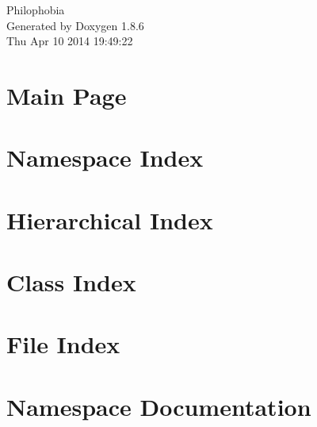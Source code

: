 \documentclass[twoside]{book}
\newcommand{\clearemptydoublepage}{%
  \newpage{\pagestyle{empty}\cleardoublepage}%
}
\begin{document}
\hypersetup{pageanchor=false}
\begin{titlepage}
\vspace*{7cm}
\begin{center}%
{\Large Philophobia }\\
\vspace*{1cm}
{\large Generated by Doxygen 1.8.6}\\
\vspace*{0.5cm}
{\small Thu Apr 10 2014 19:49:22}\\
\end{center}
\end{titlepage}
\clearemptydoublepage
\tableofcontents
\clearemptydoublepage
{}
\hypersetup{pageanchor=true}

\chapter{Main Page}
\label{index}\hypertarget{index}{}
\chapter{Namespace Index}

\chapter{Hierarchical Index}

\chapter{Class Index}

\chapter{File Index}

\chapter{Namespace Documentation}












\end{document}
